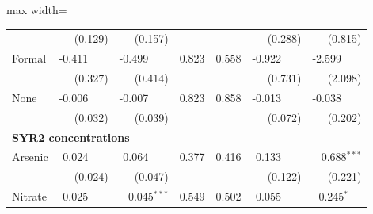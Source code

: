 \begin{table}[htbp]
{\begin{adjustbox}{max width=\linewidth}
\begin{tabular}{lrrrrrr}
 & (\phantom{-}0.129)\phantom{$^{***}$} & (\phantom{-}0.157)\phantom{$^{***}$} &  &  & (\phantom{-}\phantom{0}0.288)\phantom{$^{***}$} & (\phantom{-}\phantom{0}0.815)\phantom{$^{***}$} \\
Formal & \phantom{(}-0.411$^{\phantom{*}\phantom{*}\phantom{*}}$ & \phantom{(}-0.499$^{\phantom{*}\phantom{*}\phantom{*}}$ & \phantom{(}\phantom{-}0.823\phantom{$^{***}$} & \phantom{(}\phantom{-}0.558\phantom{$^{***}$} & \phantom{(}-\phantom{0}0.922$^{\phantom{*}\phantom{*}\phantom{*}}$ & \phantom{(}-\phantom{0}2.599$^{\phantom{*}\phantom{*}\phantom{*}}$ \\
 & (\phantom{-}0.327)\phantom{$^{***}$} & (\phantom{-}0.414)\phantom{$^{***}$} &  &  & (\phantom{-}\phantom{0}0.731)\phantom{$^{***}$} & (\phantom{-}\phantom{0}2.098)\phantom{$^{***}$} \\
None & \phantom{(}-0.006$^{\phantom{*}\phantom{*}\phantom{*}}$ & \phantom{(}-0.007$^{\phantom{*}\phantom{*}\phantom{*}}$ & \phantom{(}\phantom{-}0.823\phantom{$^{***}$} & \phantom{(}\phantom{-}0.858\phantom{$^{***}$} & \phantom{(}-\phantom{0}0.013$^{\phantom{*}\phantom{*}\phantom{*}}$ & \phantom{(}-\phantom{0}0.038$^{\phantom{*}\phantom{*}\phantom{*}}$ \\
 & (\phantom{-}0.032)\phantom{$^{***}$} & (\phantom{-}0.039)\phantom{$^{***}$} &  &  & (\phantom{-}\phantom{0}0.072)\phantom{$^{***}$} & (\phantom{-}\phantom{0}0.202)\phantom{$^{***}$} \\
\multicolumn{7}{l}{\textbf{SYR2 concentrations}} \\
Arsenic & \phantom{(}\phantom{-}0.024$^{\phantom{*}\phantom{*}\phantom{*}}$ & \phantom{(}\phantom{-}0.064$^{\phantom{*}\phantom{*}\phantom{*}}$ & \phantom{(}\phantom{-}0.377\phantom{$^{***}$} & \phantom{(}\phantom{-}0.416\phantom{$^{***}$} & \phantom{(}\phantom{-}\phantom{0}0.133$^{\phantom{*}\phantom{*}\phantom{*}}$ & \phantom{(}\phantom{-}\phantom{0}0.688$^{***}$ \\
 & (\phantom{-}0.024)\phantom{$^{***}$} & (\phantom{-}0.047)\phantom{$^{***}$} &  &  & (\phantom{-}\phantom{0}0.122)\phantom{$^{***}$} & (\phantom{-}\phantom{0}0.221)\phantom{$^{***}$} \\
Nitrate & \phantom{(}\phantom{-}0.025$^{\phantom{*}\phantom{*}\phantom{*}}$ & \phantom{(}\phantom{-}0.045$^{***}$ & \phantom{(}\phantom{-}0.549\phantom{$^{***}$} & \phantom{(}\phantom{-}0.502\phantom{$^{***}$} & \phantom{(}\phantom{-}\phantom{0}0.055$^{\phantom{*}\phantom{*}\phantom{*}}$ & \phantom{(}\phantom{-}\phantom{0}0.245$^{*\phantom{*}\phantom{*}}$ \\

\end{tabular}
\end{adjustbox}}
\end{table}
